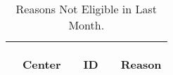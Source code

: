 \documentclass[dvips,10pt]{article}
\begin{document}
\begin{table}[t]
\begin{center}
\begin{tabular}{ @{}l@{}
@{}l@{}@{}p{1.5em}@{}@{}c@{}@{}p{1.5em}@{}@{}c@{}@{}p{1.5em}@{}@{}c@{}@{}p{1.5em}@{}@{}c@{}
}
\end{tabular}

\end{center}
 \end{table}
\clearpage
\begin{table}[t]
\caption
{ Reasons Not Eligible in Last Month. }
\begin{center}
\begin{tabular}{ @{}l@{}
@{}l@{}@{}p{1.5em}@{}@{}c@{}@{}p{1.5em}@{}@{}l@{}
}
\hline

& \parbox{6em}{\begin{center}Center\end{center}} && \parbox{6em}{\begin{center}ID\end{center}} && \parbox{6em}{\begin{center}Reason\end{center}} \\

\hline


\end{tabular}
\end{center}
\end{table}
\end{document}
